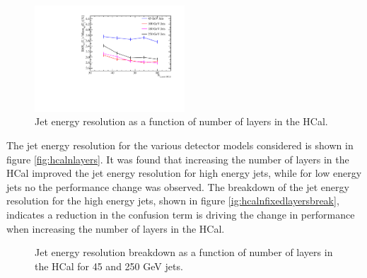 \begin{figure}
\centering
\includegraphics[width=0.5\textwidth]{OptimisationStudies/Plots/JetEnergyResolutions/JER_vs_NumberOfHCalLayersOfFixedDepth.pdf}
\caption[Jet energy resolution as a function of number of layers in the HCal.]{Jet energy resolution as a function of number of layers in the HCal.}
\label{fig:hcalnfixedlayers}
\end{figure}

The jet energy resolution for the various detector models considered is shown in figure \ref{fig:hcalnlayers}.  It was found that increasing the number of layers in the HCal improved the jet energy resolution for high energy jets, while for low energy jets no the performance change was observed.  The breakdown of the jet energy resolution for the high energy jets, shown in figure \ref{ig:hcalnfixedlayersbreak}, indicates a reduction in the confusion term is driving the change in performance when increasing the number of layers in the HCal.  

\begin{figure}
\centering
{}
\caption[Jet energy resolution breakdown as a function of number of layers in the HCal for 45 and 250 GeV jets.]{Jet energy resolution breakdown as a function of number of layers in the HCal for 45 and 250 GeV jets.}
\label{fig:hcalnfixedlayersbreak}
\end{figure}

